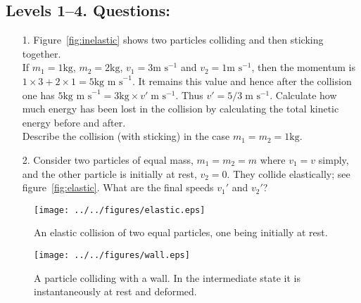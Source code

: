\subsection*{Levels 1--4.  Questions:}
\begin{itemize}
\item[1.]  Figure~\ref{fig:inelastic} shows two particles colliding and then sticking together.\\
If $m_1 = 1 \textrm{kg}$, $m_2 = 2\textrm{kg}$, $v_1 = 3 \textrm{m s}^{-1}$ and
$v_2 = 1\textrm{m s}^{-1}$, then the momentum is $1 \times 3 + 2 \times 1  = 5 \textrm{kg m s}^{-1}$.
It remains this value and hence after the collision one has $5 \textrm{kg m s}^{-1} = 3 \textrm{kg} \times v' \; \textrm{m s}^{-1}$.  Thus $ v' = 5/3 \; \textrm{m s}^{-1}$.
\nl
Calculate how much energy has been lost in the collision by calculating the total kinetic energy before and after.\\
Describe the collision (with sticking) in the case $m_1 = m_2 = 1\textrm{kg}$.\\

\item[2.]  Consider two particles of equal mass, $m_1 = m_2 = m$ where $v_1 = v$ simply, and the other particle is initially at rest, $v_2=0$.  They collide elastically; see figure~\ref{fig:elastic}.  What are the final speeds $v_1'$ and $v_2'$?

\end{itemize}
\begin{figure}[h!]%
\hspace{1.0cm}
\begin{minipage}{.45\textwidth}
  \centering
  \texttt{[image: ../../figures/elastic.eps]}
  \caption{An elastic collision of two equal particles, one being initially at rest.}
  \label{fig:elastic}
\end{minipage}\hspace{0.2cm}
\begin{minipage}{.45\textwidth}
  \centering
  \texttt{[image: ../../figures/wall.eps]}
  \caption{A particle colliding with a wall.  In the intermediate state it is instantaneously at rest and deformed.}
  \label{fig:wall}
\end{minipage}
\end{figure}


